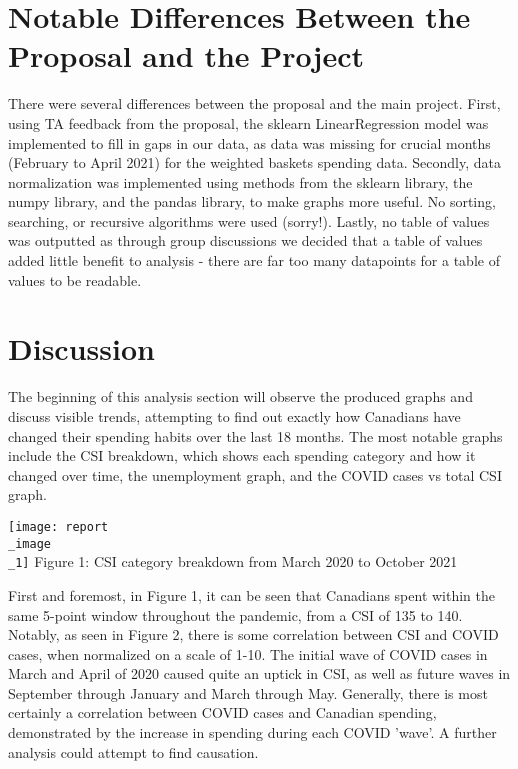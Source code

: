 \documentclass[fontsize=11pt]{article}
\begin{document}
\section*{Notable Differences Between the Proposal and the Project}
\tab There were several differences between the proposal and the main project. First, using TA feedback from the proposal, the sklearn LinearRegression model was implemented to fill in gaps in our data, as data was missing for crucial months (February to April 2021) for the weighted baskets spending data. Secondly, data normalization was implemented using methods from the sklearn library, the numpy library, and the pandas library, to make graphs more useful. No sorting, searching, or recursive algorithms were used (sorry!). Lastly, no table of values was outputted as through group discussions we decided that a table of values added little benefit to analysis - there are far too many datapoints for a table of values to be readable.

\section*{Discussion}
\tab The beginning of this analysis section will observe the produced graphs and discuss visible trends, attempting to find out exactly how Canadians have changed their spending habits over the last 18 months. The most notable graphs include the CSI breakdown, which shows each spending category and how it changed over time, the unemployment graph, and the COVID cases vs total CSI graph.\\

\begin{center}
\texttt{[image: report\\\_image\\\_1]}
Figure 1: CSI category breakdown from March 2020 to October 2021
\end{center}

\tab First and foremost, in Figure 1, it can be seen that Canadians spent within the same 5-point window throughout the pandemic, from a CSI of 135 to 140. Notably, as seen in Figure 2, there is some correlation between CSI and COVID cases, when normalized on a scale of 1-10. The initial wave of COVID cases in March and April of 2020 caused quite an uptick in CSI, as well as future waves in September through January and March through May. Generally, there is most certainly a correlation between COVID cases and Canadian spending, demonstrated by the increase in spending during each COVID 'wave'. A further analysis could attempt to find causation.\\
\end{document}
